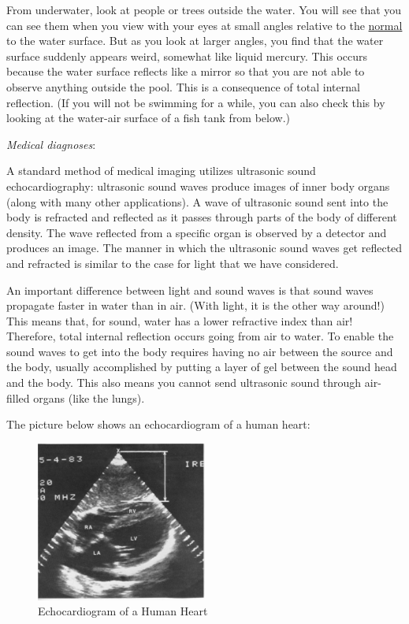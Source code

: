 From underwater, look at people or trees outside the water. You will see that you can see them when you view with your eyes at small angles relative to the \underline{normal} to the water surface. But as you look at larger angles, you find that the water surface suddenly appears weird, somewhat like liquid mercury. This occurs because the water surface reflects like a mirror so that you are not able to observe anything outside the pool. This is a consequence of total internal reflection. (If you will not be swimming for a while, you can also check this by looking at the water-air surface of a fish tank from below.)\vspace{0.6\baselineskip}

\noindent\emph{Medical diagnoses}:\vspace{0.6\baselineskip}

A standard method of medical imaging utilizes ultrasonic sound echocardiography: ultrasonic sound waves produce images of inner body organs (along with many other applications). A wave of ultrasonic sound sent into the body is refracted and reflected as it passes through parts of the body of different density. The wave reflected from a specific organ is observed by a detector and produces an image. The manner in which the ultrasonic sound waves get reflected and refracted is similar to the case for light that we have considered.\myskip

An important difference between light and sound waves is that sound waves propagate faster in water than in air. (With light, it is the other way around!)  This means that, for sound, water has a lower refractive index than air! Therefore, total internal reflection occurs going from air to water.  To enable the sound waves to get into the body requires having no air between the source and the body, usually accomplished by putting a layer of gel between the sound head and the body. This also means you cannot send ultrasonic sound through air-filled organs (like the lungs).

The picture below shows an echocardiogram of a human heart:
\begin{figure}[h]
    \begin{center}
        \includegraphics[width=0.5\textwidth]{./Exp6/pic/image021.png}
    \end{center}
    \caption{Echocardiogram of a Human Heart}
    \label{fig:heartgram}
\end{figure}
 
